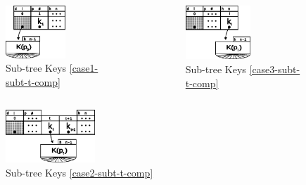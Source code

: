\begin{frame}
    \begin{columns}
        \begin{column}{0.5\textwidth}
            \begin{figure}
                \centering
                \includegraphics[width=0.55\textwidth]{resources/made/keys_comp_case1.eps}
                \caption{Sub-tree Keys \eqref{case1-subt-t-comp}}
            \end{figure}
        \end{column}
        \begin{column}{0.5\textwidth}
            \begin{figure}
                \centering
                \includegraphics[width=0.55\textwidth]{resources/made/keys_comp_case3.eps}
                \caption{Sub-tree Keys \eqref{case3-subt-t-comp}}
            \end{figure}
        \end{column}
    \end{columns}
    \begin{figure}
        \centering
        \includegraphics[width=0.3\textwidth]{resources/made/keys_comp_case2.eps}
        \caption{Sub-tree Keys \eqref{case2-subt-t-comp}}
    \end{figure}
\end{frame}
